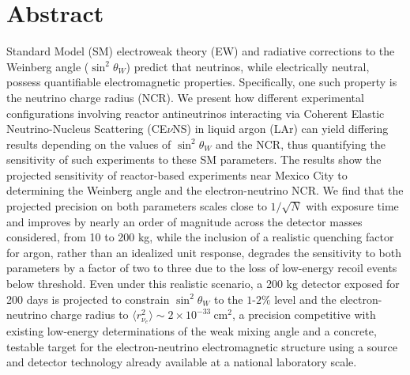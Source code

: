 \chapter*{Abstract}
Standard Model (SM) electroweak theory (EW) and radiative corrections to the Weinberg angle ($\sin^2\theta_W$) predict that neutrinos, while electrically neutral, possess quantifiable electromagnetic properties. Specifically, one such property is the neutrino charge radius (NCR). We present how different experimental configurations involving reactor antineutrinos interacting via Coherent Elastic Neutrino-Nucleus Scattering (CE$\nu$NS) in liquid argon (LAr) can yield differing results depending on the values of $\sin^2\theta_W$ and the NCR, thus quantifying the sensitivity of such experiments to these SM parameters. The results show the projected sensitivity of reactor-based experiments near Mexico City to determining the Weinberg angle and the electron-neutrino NCR. We find that the projected precision on both parameters scales close to $1/\sqrt{N}$ with exposure time and improves by nearly an order of magnitude across the detector masses considered, from 10 to 200 kg, while the inclusion of a realistic quenching factor for argon, rather than an idealized unit response, degrades the sensitivity to both parameters by a factor of two to three due to the loss of low-energy recoil events below threshold. Even under this realistic scenario, a 200 kg detector exposed for 200 days is projected to constrain $\sin^2\theta_W$ to the $1$-$2\%$ level and the electron-neutrino charge radius to $\langle r_{\nu_e}^2\rangle \sim 2\times10^{-33}\ \text{cm}^2$, a precision competitive with existing low-energy determinations of the weak mixing angle and a concrete, testable target for the electron-neutrino electromagnetic structure using a source and detector technology already available at a national laboratory scale.
